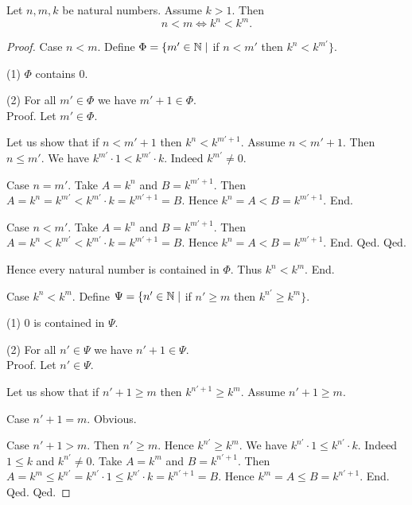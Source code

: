 \documentclass[../arithmetic.tex]{subfiles}
\begin{document}
  \begin{forthel}
    \begin{proposition}
      Let $n, m, k$ be natural numbers.
      Assume $k > 1$.
      Then \[ n < m \iff k^{n} < k^{m}. \]
    \end{proposition}
    \begin{proof}
      Case $n < m$.
        Define $\Phi = \{ m' \in \mathbb{N} \mid$ if $n < m'$ then
        $k^{n} < k^{m'} \}$.

        (1) $\Phi$ contains $0$.

        (2) For all $m' \in \Phi$ we have $m' + 1 \in \Phi$. \\
        Proof.
          Let $m' \in \Phi$.

          Let us show that if $n < m' + 1$ then $k^{n} < k^{m' + 1}$.
            Assume $n < m' + 1$.
            Then $n \leq m'$.
            We have $k^{m'} \cdot 1 < k^{m'} \cdot k$.
            Indeed $k^{m'} \neq 0$.

            Case $n = m'$.
              Take $A = k^{n}$ and $B = k^{m' + 1}$. %
              Then $A
                = k^{n}
                = k^{m'}
                < k^{m'} \cdot k
                = k^{m' + 1}
                = B$.
              Hence $k^{n} = A < B = k^{m' + 1}$.
            End.

            Case $n < m'$.
              Take $A = k^{n}$ and $B = k^{m' + 1}$. %
              Then $A
                = k^{n}
                < k^{m'}
                < k^{m'} \cdot k
                = k^{m' + 1}
                = B$.
              Hence $k^{n} = A < B = k^{m' + 1}$.
            End.
          Qed.
        Qed.

        Hence every natural number is contained in $\Phi$.
        Thus $k^{n} < k^{m}$.
      End.

      Case $k^{n} < k^{m}$.
        Define $\Psi = \{ n' \in \mathbb{N} \mid$ if $n' \geq m$ then
        $k^{n'} \geq k^{m} \}$.

        (1) $0$ is contained in $\Psi$.

        (2) For all $n' \in \Psi$ we have $n' + 1 \in \Psi$. \\
        Proof.
          Let $n' \in \Psi$.

          Let us show that if $n' + 1 \geq m$ then $k^{n' + 1} \geq k^{m}$.
            Assume $n' + 1 \geq m$.

            Case $n' + 1 = m$. Obvious.

            Case $n' + 1 > m$.
              Then $n' \geq m$.
              Hence $k^{n'} \geq k^{m}$.
              We have $k^{n'} \cdot 1 \leq k^{n'} \cdot k$.
              Indeed $1 \leq k$ and $k^{n'} \neq 0$.
              Take $A = k^{m}$ and $B = k^{n' + 1}$. %
              Then $A
                = k^{m}
                \leq k^{n'}
                = k^{n'} \cdot 1
                \leq k^{n'} \cdot k
                = k^{n' + 1}
                = B$.
              Hence $k^{m} = A \leq B = k^{n' + 1}$.
            End.
          Qed.
        Qed.


\end{proof}
\end{forthel}
\end{document}
